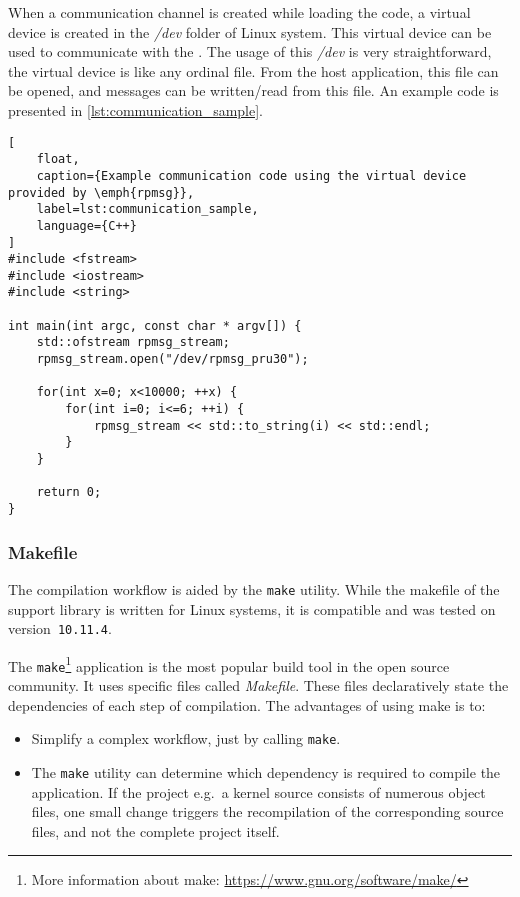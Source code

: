 When a communication channel is created while loading the \pru{} code, a virtual device is created in the \emph{/dev} folder of Linux system. This virtual device can be used to communicate with the \pru{}. The usage of this \emph{/dev} is very straightforward, the virtual device is like any ordinal file. From the host application, this file can be opened, and messages can be written/read from this file. An example code is presented in \cref{lst:communication_sample}.

\begin{lstlisting}[
	float,
	caption={Example communication code using the virtual device provided by \emph{rpmsg}},
	label=lst:communication_sample,
	language={C++}
]
#include <fstream>
#include <iostream>
#include <string>

int main(int argc, const char * argv[]) {
	std::ofstream rpmsg_stream;
	rpmsg_stream.open("/dev/rpmsg_pru30");

	for(int x=0; x<10000; ++x) {
		for(int i=0; i<=6; ++i) {
			rpmsg_stream << std::to_string(i) << std::endl;
		}
	}

	return 0;
}
\end{lstlisting}

\subsubsection{Makefile}

The compilation workflow is aided by the \verb+make+ utility. While the makefile of the support library is written for Linux systems, it is compatible and was tested on \osx{} version~\verb|10.11.4|.

The \verb+make+\footnote{More information about make: \url{https://www.gnu.org/software/make/}} application is the most popular build tool in the open source community. It uses specific files called \emph{Makefile}. These files declaratively state the dependencies of each step of compilation. The advantages of using make is to:
\begin{itemize}
	\item Simplify a complex workflow, just by calling \verb+make+.
	\item The \verb+make+ utility can determine which dependency is required to compile the application. If the project e.g.\ a kernel source consists of numerous object files, one small change triggers the recompilation of the corresponding source files, and not the complete project itself.
\end{itemize}

